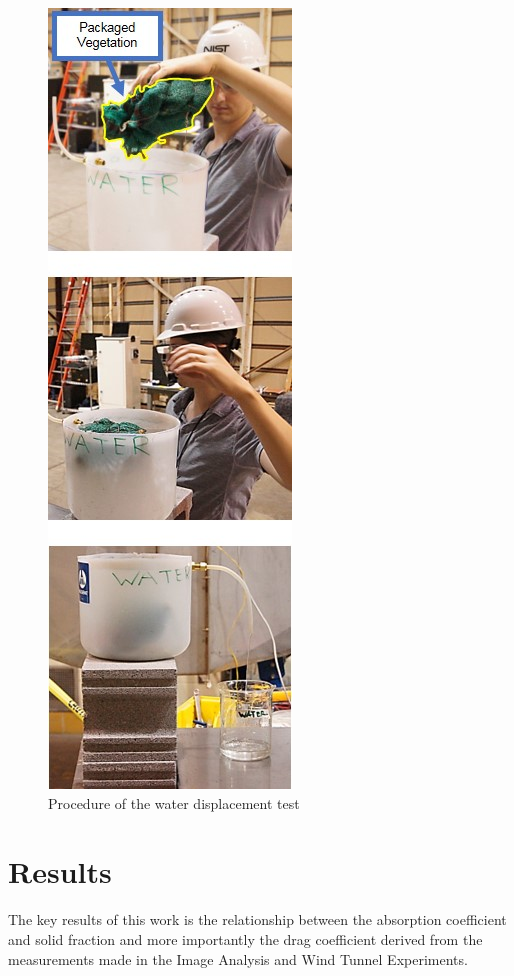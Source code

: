 \documentclass[12pt]{article}
\begin{document}
\begin{figure} [!]
	\centering 	\includegraphics[height=\textheight,keepaspectratio]{Picture7.jpg}
	\caption{Procedure of the water displacement test}
	\label{fig:wdt}
\end{figure}

\pagebreak



\section{Results}
\label{sec:results}

The key results of this work is the relationship between the absorption coefficient and solid fraction and more importantly the drag coefficient derived from the measurements made in the Image Analysis and Wind Tunnel Experiments.
\end{document}
